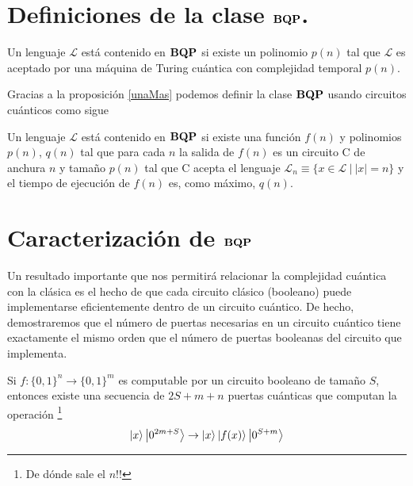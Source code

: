 \section{Definiciones de la clase \texorpdfstring{$\operatorname{\mathbf{BQP}}$}{BQP}.}

\begin{redBox}
\begin{defin} 
Un lenguaje $\mathcal{L}$ está contenido en $\operatorname{\mathbf{BQP}}$ si existe un polinomio $p(n)$ tal que $\mathcal{L}$ es aceptado por una máquina de Turing cuántica con complejidad temporal $p(n)$.
\end{defin}
\end{redBox}

Gracias a la proposición \ref{unaMas} podemos definir la clase $\operatorname{\mathbf{BQP}}$ usando circuitos cuánticos como sigue\\

\begin{redBox}
\begin{defin}
Un lenguaje $\mathcal{L}$ está contenido en $\operatorname{\mathbf{BQP}}$ si existe una función $f(n)$ y polinomios $p(n)$, $q(n)$ tal que para cada $n$ la salida de $f(n)$ es un circuito C de anchura $n$ y tamaño $p(n)$ tal que C acepta el lenguaje $\mathcal{L}_n\equiv \{x\in\mathcal{L}\ |\  |x|=n\}$ y el tiempo de ejecución de $f(n)$ es, como máximo, $q(n)$.
\end{defin}
\end{redBox}

\section{Caracterización de \texorpdfstring{$\operatorname{\mathbf{BQP}}$}{BQP}}

Un resultado importante que nos permitirá relacionar la complejidad cuántica con la clásica es el hecho de que cada circuito clásico (booleano) puede implementarse eficientemente dentro de un circuito cuántico. De hecho, demostraremos que el número de puertas necesarias en un circuito cuántico tiene exactamente el mismo orden que el número de puertas booleanas del circuito que implementa.\\

\begin{teo}\label{teoEquivCirc} Si $f:\{0,1\}^n\rightarrow\{0,1\}^m$ es computable por un circuito booleano de tamaño $S$, entonces existe una secuencia de $2S+m+n$ puertas cuánticas que computan la operación \footnote{De dónde sale el $n$!!}
\begin{equation}
\ket{x}\ket{0^{2m+S}} \rightarrow \ket{x}\ket{f(x)}\ket{0^{S+m}}
\end{equation}
\end{teo}

